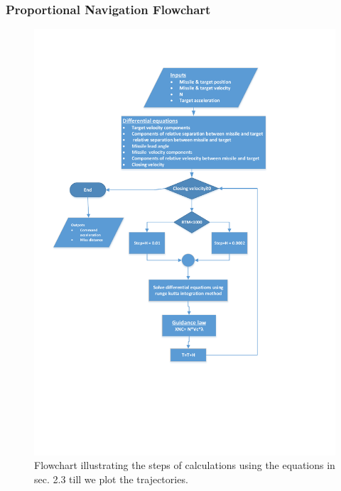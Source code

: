 \documentclass{beamer}
\begin{document}
\begin{frame}
\frametitle{Proportional Navigation Flowchart}
\begin{figure}[H]
\centering
\includegraphics[scale = 0.3]{fig/FlowchartPN.pdf}
\caption{Flowchart illustrating the steps of calculations using the equations in sec. 2.3  till we plot the trajectories.}
\label{flowchart PN}
\end{figure}
\end{frame}
\end{document}
